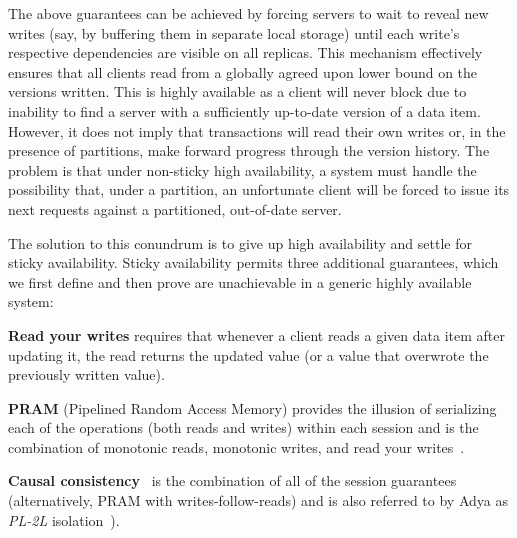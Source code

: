 The above guarantees can be achieved by forcing servers to wait to
reveal new writes (say, by buffering them in separate local storage)
until each write's respective dependencies are visible on all
replicas. This mechanism effectively ensures that all clients read
from a globally agreed upon lower bound on the versions written. This
is highly available as a client will never block due to inability to
find a server with a sufficiently up-to-date version of a data
item. However, it does not imply that transactions will read their own
writes or, in the presence of partitions, make forward progress
through the version history. The problem is that under non-sticky high
availability, a system must handle the possibility that, under a
partition, an unfortunate client will be forced to issue its next
requests against a partitioned, out-of-date server.

The solution to this conundrum is to give up high availability and
settle for sticky availability. Sticky availability permits three
additional guarantees, which we first define and then prove are
unachievable in a generic highly available system:

\vspace{.5em}\noindent\textbf{{Read your writes}} requires that
whenever a client reads a given data item after updating it, the read
returns the updated value (or a value that overwrote the previously
written value).

\vspace{.5em}\noindent\textbf{{PRAM}} (Pipelined Random Access Memory)
provides the illusion of serializing each of the operations (both
reads and writes) within each session and is the combination of
monotonic reads, monotonic writes, and read your
writes~\cite{herlihy-art}.

\vspace{.5em}\noindent\textbf{{Causal
    consistency}}~\cite{causalmemory} is the combination of all of the
session guarantees~\cite{sessiontocausal} (alternatively, PRAM with
writes-follow-reads) and is also referred to by Adya as \textit{PL-2L}
isolation~\cite{adya}).\vspace{.5em}


